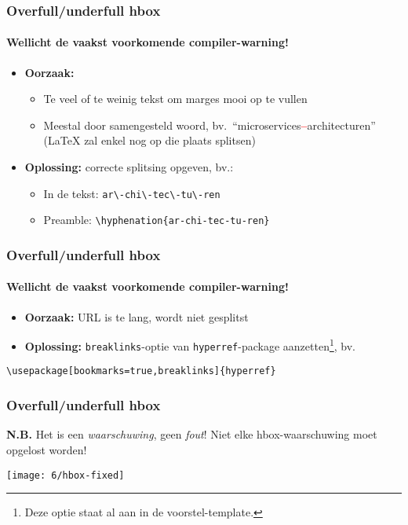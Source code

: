 \documentclass[aspectratio=169]{beamer}
\begin{document}
\begin{frame}[fragile]
  \frametitle{Overfull/underfull hbox}
  \framesubtitle{Wellicht de vaakst voorkomende compiler-warning!}

  \begin{itemize}
    \item \textbf{Oorzaak:}
          \begin{itemize}
            \item Te veel of te weinig tekst om marges mooi op te vullen
            \item Meestal door samengesteld woord, bv.\ ``microservices\textcolor{red}{\textbf{--}}architecturen''
                  ({\LaTeX} zal enkel nog op die plaats splitsen)
          \end{itemize}
    \item \textbf{Oplossing:} correcte splitsing opgeven, bv.:
          \begin{itemize}
            \item In de tekst: \verb|ar\-chi\-tec\-tu\-ren|
            \item Preamble: \verb|\hyphenation{ar-chi-tec-tu-ren}|
          \end{itemize}
  \end{itemize}

\end{frame}

\begin{frame}[fragile]
  \frametitle{Overfull/underfull hbox}
  \framesubtitle{Wellicht de vaakst voorkomende compiler-warning!}

  \begin{itemize}
    \item \textbf{Oorzaak:} URL is te lang, wordt niet gesplitst
    \item \textbf{Oplossing:} \texttt{breaklinks}-optie van \texttt{hyperref}-package aanzetten\footnote{Deze optie staat al aan in de voorstel-template.}, bv.
  \end{itemize}

  \begin{verbatim}
\usepackage[bookmarks=true,breaklinks]{hyperref}
\end{verbatim}
\end{frame}

\begin{frame}
  \frametitle{Overfull/underfull hbox}

  \textbf{N.B.} Het is een \emph{waarschuwing}, geen \emph{fout}! Niet elke hbox-waarschuwing moet opgelost worden!

  \centering
  \texttt{[image: 6/hbox-fixed]}

\end{frame}
\end{document}
